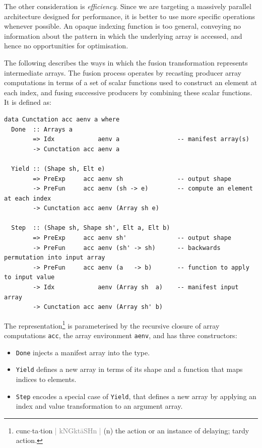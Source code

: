 The other consideration is \emph{efficiency}. Since we are targeting a massively
parallel architecture designed for performance, it is better to use more
specific operations whenever possible. An opaque indexing function is too
general, conveying no information about the pattern in which the underlying
array is accessed, and hence no opportunities for optimisation.

The following describes the ways in which the fusion transformation represents
intermediate arrays. The fusion process operates by recasting producer array
computations in terms of a set of scalar functions used to construct an element
at each index, %
and fusing successive producers by combining these scalar functions. It is
defined as:
%
\begin{lstlisting}[style=haskell
    ,caption={Representation of fusible producer arrays}]
data Cunctation acc aenv a where
  Done  :: Arrays a
        => Idx            aenv a                -- manifest array(s)
        -> Cunctation acc aenv a

  Yield :: (Shape sh, Elt e)
        => PreExp     acc aenv sh               -- output shape
        -> PreFun     acc aenv (sh -> e)        -- compute an element at each index
        -> Cunctation acc aenv (Array sh e)

  Step  :: (Shape sh, Shape sh', Elt a, Elt b)
        => PreExp     acc aenv sh'              -- output shape
        -> PreFun     acc aenv (sh' -> sh)      -- backwards permutation into input array
        -> PreFun     acc aenv (a   -> b)       -- function to apply to input value
        -> Idx            aenv (Array sh  a)    -- manifest input array
        -> Cunctation acc aenv (Array sh' b)
\end{lstlisting}
%
The representation\footnote{
cunc$\cdot$ta$\cdot$tion
\textcolor{gray}{|
kNGk\textquotesingle t\={a}SHn
\enspace{}\textquotesingle {}
|} (n) the action or an instance of delaying; tardy action.}
%
is parameterised by the recursive closure of array computations \texttt{acc},
the array environment \texttt{aenv}, and has three constructors:
%
\begin{itemize}
\item \texttt{Done} injects a manifest array into the type.

\item \texttt{Yield} defines a new array in terms of its shape and a function
    that maps indices to elements.

\item \texttt{Step} encodes a special case of \texttt{Yield}, that defines a new
    array by applying an index and value transformation to an argument array.

\end{itemize}

